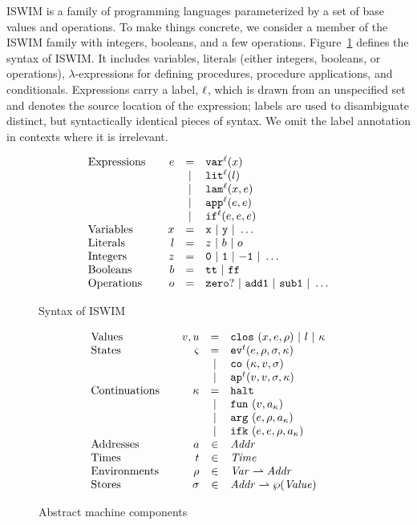 \documentclass[9pt]{sigplanconf} %
\begin{document}
ISWIM is a family of programming languages parameterized by a set of base values and operations.
%
To make things concrete, we consider a member of the ISWIM family with integers, booleans, and a few operations.
%
Figure~\ref{fig:syntax} defines the syntax of ISWIM.
%
It includes variables, literals (either integers, booleans, or operations), $\lambda$-expressions for defining procedures, procedure applications, and conditionals.
%
Expressions carry a label, ${\ell}$, which is drawn from an unspecified set and denotes the source location of the expression; labels are used to disambiguate distinct, but syntactically identical pieces of syntax.
%
We omit the label annotation in contexts where it is irrelevant.

\begin{figure}
\small
\[
\begin{array}{l@{\qquad}rcl}
\text{Expressions} & \mexp &=& \svar[^\mlab]\mvar\\
&&|& \slit[^\mlab]\mlit\\
&&|& \slam[^\mlab]\mvar\mexp\\
&&|& \sapp[^\mlab]\mexp\mexp \\
&&|& \sif[^\mlab]\mexp\mexp\mexp \\
\text{Variables}&\mvar &=& \syntax{x}\ |\ \syntax{y}\ |\ \dots\\
\text{Literals}&\mlit &=& \mnum\ |\ \mbln\ |\ \mop\\
\text{Integers}&\mnum &=& \syntax{0}\ |\ \syntax{1}\ |\ \syntax{-1}\ |\ \dots\\
\text{Booleans}&\mbln &=& \strue\ |\ \sfalse\\
\text{Operations}&\mop &=& \syntax{zero?}\ |\ \syntax{add1}\ |\ \syntax{sub1}\ |\ \dots
\end{array}
\]
\caption{Syntax of ISWIM}
\label{fig:syntax}
\end{figure}

\begin{figure}
\small
\[
\begin{array}{l@{\qquad}rcl}
\text{Values} & \mval,\mvalx{u} &=& \clos{\mvar,\mexp,\menv}\ |\ \mlit\ |\ \mkont\\
\text{States} & \mstate &=& \ev[^\mcntr]{\mexp,\menv,\msto,\mkont}\\
                       &&|& \co{\mkont,\mval,\msto}\\
                       &&|& \ap[^\mcntr]{\mval,\mval,\msto,\mkont}\\
\text{Continuations} & \mkont &=& \kmt\\
&&|& \kfn{\mval,\mkaddr}\\
&&|& \kar{\mexp,\menv,\mkaddr}\\
&&|& \kif{\mexp,\mexp,\menv,\mkaddr}\\
\text{Addresses} &\maddr&\in&\Addr \\
\text{Times} &\mcntr&\in&\Counter \\
\text{Environments} &\menv&\in& \Var \rightharpoonup \Addr\\
\text{Stores} &\msto&\in& \Addr \rightharpoonup \wp(\Value)
\end{array}
\]
\caption{Abstract machine components}
\label{fig:domains}
\end{figure}
\end{document}
